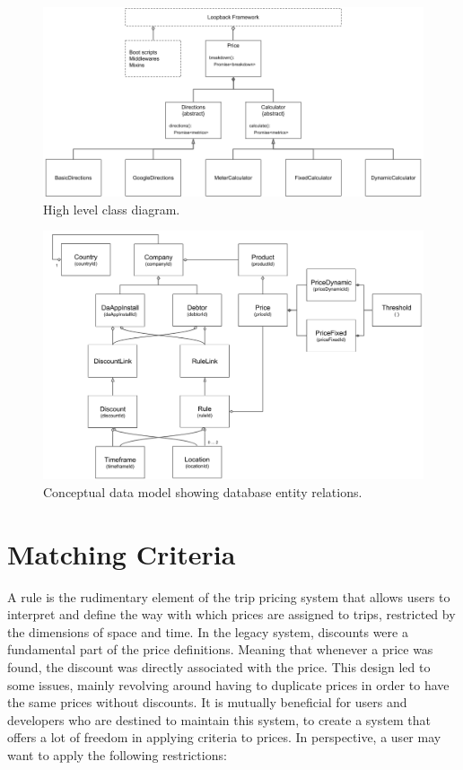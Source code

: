 \begin{figure}[H]
	\centering
	\includegraphics[width=1\textwidth]{ClassDiagram}
	\caption[Class Diagram]{High level class diagram.}
	\label{fig:Class Diagram}
\end{figure}

\begin{figure}[H]
	\centering
	\includegraphics[width=1\textwidth]{DataModel}
	\caption[Data Model]{Conceptual data model showing database entity relations.}
	\label{fig:Data Model}
\end{figure}

\section{Matching Criteria}
A rule is the rudimentary element of the trip pricing system that allows users to interpret and define the way with which prices are assigned to trips, restricted by the dimensions of space and time. In the legacy system, discounts were a fundamental part of the price definitions. Meaning that whenever a price was found, the discount was directly associated with the price. This design led to some issues, mainly revolving around having to duplicate prices in order to have the same prices without discounts. It is mutually beneficial for users and developers who are destined to maintain this system, to create a system that offers a lot of freedom in applying criteria to prices. In perspective, a user may want to apply the following restrictions:


